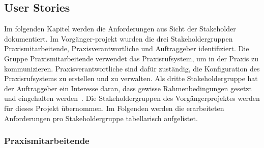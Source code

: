 \subsection{User Stories}

Im folgenden Kapitel werden die Anforderungen aus Sicht der Stakeholder dokumentiert.
Im Vorgänger-projekt wurden die drei Stakeholdergruppen Praxismitarbeitende, Praxisverantwortliche und Auftraggeber identifiziert.
Die Gruppe Praxismitarbeitende verwendet das Praxisrufsystem, um in der Praxis zu kommunizieren.
Praxisverantwortliche sind dafür zuständig, die Konfiguration des Praxisrufsystems zu erstellen und zu verwalten.
Als dritte Stakeholdergruppe hat der Auftraggeber ein Interesse daran, dass gewisse Rahmenbedingungen gesetzt und eingehalten werden~\cite{ip5}.
Die Stakeholdergruppen des Vorgängerprojektes werden für dieses Projekt übernommen.
Im Folgenden werden die erarbeiteten Anforderungen pro Stakeholdergruppe tabellarisch aufgelistet.

\subsubsection{Praxismitarbeitende}


